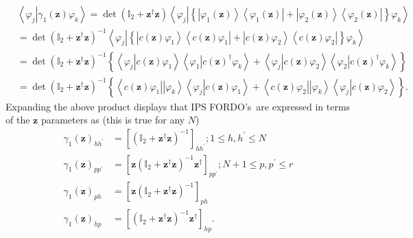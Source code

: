 \documentclass[aps,preprint]{revtex4}%
\begin{document}
\begin{align}
&  \left\langle \left.  \varphi_{j}\right\vert \gamma_{1}\left(
\mathbf{z}\right)  \varphi_{k}\right\rangle =\det\left(  \mathbb{I}%
_{2}+\mathbf{z}^{\dagger}\mathbf{z}\right)  \left\langle \left.  \varphi
_{j}\right\vert \left\{  \left\vert \varphi_{1}\left(  \mathbf{z}\right)
\right\rangle \left\langle \varphi_{1}\left(  \mathbf{z}\right)  \right\vert
+\left\vert \varphi_{2}\left(  \mathbf{z}\right)  \right\rangle \left\langle
\varphi_{2}\left(  \mathbf{z}\right)  \right\vert \right\}  \varphi
_{k}\right\rangle \nonumber\\
&  =\det\left(  \mathbb{I}_{2}+\mathbf{z}^{\dagger}\mathbf{z}\right)
^{-1}\left\langle \left.  \varphi_{j}\right\vert \left\{  \left\vert c\left(
\mathbf{z}\right)  \varphi_{1}\right\rangle \left\langle c\left(
\mathbf{z}\right)  \varphi_{1}\right\vert +\left\vert c\left(  \mathbf{z}%
\right)  \varphi_{2}\right\rangle \left\langle c\left(  \mathbf{z}\right)
\varphi_{2}\right\vert \right\}  \varphi_{k}\right\rangle \nonumber\\
&  =\det\left(  \mathbb{I}_{2}+\mathbf{z}^{\dagger}\mathbf{z}\right)
^{-1}\left\{  \left\langle \left.  \varphi_{j}\right\vert c\left(
\mathbf{z}\right)  \varphi_{1}\right\rangle \left\langle \left.  \varphi
_{1}\right\vert c\left(  \mathbf{z}\right)  ^{\dagger}\varphi_{k}\right\rangle
+\left\langle \left.  \varphi_{j}\right\vert c\left(  \mathbf{z}\right)
\varphi_{2}\right\rangle \left\langle \left.  \varphi_{2}\right\vert c\left(
\mathbf{z}\right)  ^{\dagger}\varphi_{k}\right\rangle \right\} \nonumber\\
&  =\det\left(  \mathbb{I}_{2}+\mathbf{z}^{\dagger}\mathbf{z}\right)
^{-1}\left\{  \left\langle \left.  c\left(  \mathbf{z}\right)  \varphi
_{1}\right\vert \left\vert \varphi_{k}\right\rangle \left\langle \varphi
_{j}\right\vert c\left(  \mathbf{z}\right)  \varphi_{1}\right\rangle
+\left\langle \left.  c\left(  \mathbf{z}\right)  \varphi_{2}\right\vert
\left\vert \varphi_{k}\right\rangle \left\langle \varphi_{j}\right\vert
c\left(  \mathbf{z}\right)  \varphi_{2}\right\rangle \right\}  .
\end{align}
Expanding the above product displays that IPS FORDO's\ are expressed in terms
of the $\mathbf{z}$ parameters as (this is true for any $N$)
\begin{align}
\gamma_{1}\left(  \mathbf{z}\right)  _{hh^{\prime}}  &  =\left[  \left(
\mathbb{I}_{2}+\mathbf{z}^{\dagger}\mathbf{z}\right)  ^{-1}\right]
_{hh^{\prime}};1\leq h,h^{\prime}\leq N\nonumber\\
\gamma_{1}\left(  \mathbf{z}\right)  _{pp^{\prime}}  &  =\left[
\mathbf{z}\left(  \mathbb{I}_{2}+\mathbf{z}^{\dagger}\mathbf{z}\right)
^{-1}\mathbf{z}^{\dagger}\right]  _{pp^{\prime}};N+1\leq p,p^{\prime}\leq
r\nonumber\\
\gamma_{1}\left(  \mathbf{z}\right)  _{ph}  &  =\left[  \mathbf{z}\left(
\mathbb{I}_{2}+\mathbf{z}^{\dagger}\mathbf{z}\right)  ^{-1}\right]
_{ph}\nonumber\\
\gamma_{1}\left(  \mathbf{z}\right)  _{hp}  &  =\left[  \left(  \mathbb{I}%
_{2}+\mathbf{z}^{\dagger}\mathbf{z}\right)  ^{-1}\mathbf{z}^{\dagger}\right]
_{hp}.
\end{align}
\end{document}
